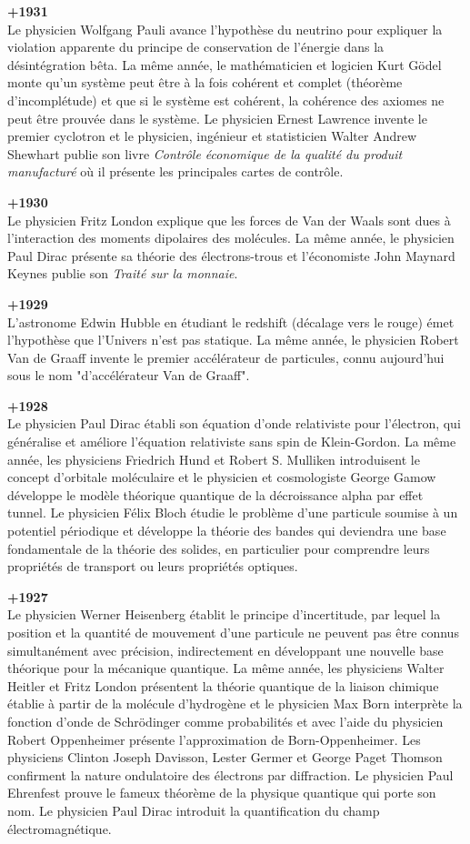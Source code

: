 \textbf{+1931}\\
Le physicien Wolfgang Pauli avance l'hypothèse du neutrino pour expliquer la violation apparente du principe de conservation de l'énergie dans la désintégration bêta. La même année, le mathématicien et logicien Kurt Gödel monte qu'un système peut être à la fois cohérent et complet (théorème d'incomplétude) et que si le système est cohérent, la cohérence des axiomes ne peut être prouvée dans le système. Le physicien Ernest Lawrence invente le premier cyclotron et le physicien, ingénieur et statisticien Walter Andrew Shewhart publie son livre \textit{Contrôle économique de la qualité du produit manufacturé} où il présente les principales cartes de contrôle.

\textbf{+1930}\\
Le physicien Fritz London explique que les forces de Van der Waals sont dues à l'interaction des moments dipolaires des molécules. La même année, le physicien Paul Dirac présente sa théorie des électrons-trous et l'économiste John Maynard Keynes publie son \textit{Traité sur la monnaie}.

\textbf{+1929}\\
L'astronome Edwin Hubble en étudiant le redshift (décalage vers le rouge) émet l'hypothèse que l'Univers n'est pas statique. La même année, le physicien Robert Van de Graaff invente le premier accélérateur de particules, connu aujourd'hui sous le nom "d'accélérateur Van de Graaff".

\textbf{+1928}\\
Le physicien Paul Dirac établi son équation d'onde relativiste pour l'électron, qui généralise et améliore l'équation relativiste sans spin de Klein-Gordon. La même année, les physiciens Friedrich Hund et Robert S. Mulliken introduisent le concept d'orbitale moléculaire et le physicien et cosmologiste George Gamow développe le modèle théorique quantique de la décroissance alpha  par effet tunnel. Le physicien Félix Bloch étudie le problème d'une particule soumise à un potentiel périodique et développe la théorie des bandes qui deviendra une base fondamentale de la théorie des solides, en particulier pour comprendre leurs propriétés de transport ou leurs propriétés optiques.

\textbf{+1927}\\
Le physicien Werner Heisenberg établit le principe d'incertitude, par lequel la position et la quantité de mouvement d'une particule ne peuvent pas être connus simultanément avec précision, indirectement en développant une nouvelle base théorique pour la mécanique quantique. La même année, les physiciens Walter Heitler et Fritz London présentent la théorie quantique de la liaison chimique établie à partir de la molécule d'hydrogène et le physicien Max Born interprète la fonction d'onde de Schrödinger comme probabilités et avec l'aide du physicien Robert Oppenheimer présente l'approximation de Born-Oppenheimer. Les physiciens Clinton Joseph Davisson, Lester Germer et George Paget Thomson confirment la nature ondulatoire des électrons par diffraction. Le physicien Paul Ehrenfest prouve le fameux théorème de la physique quantique qui porte son nom. Le physicien Paul Dirac introduit la quantification du champ électromagnétique.

